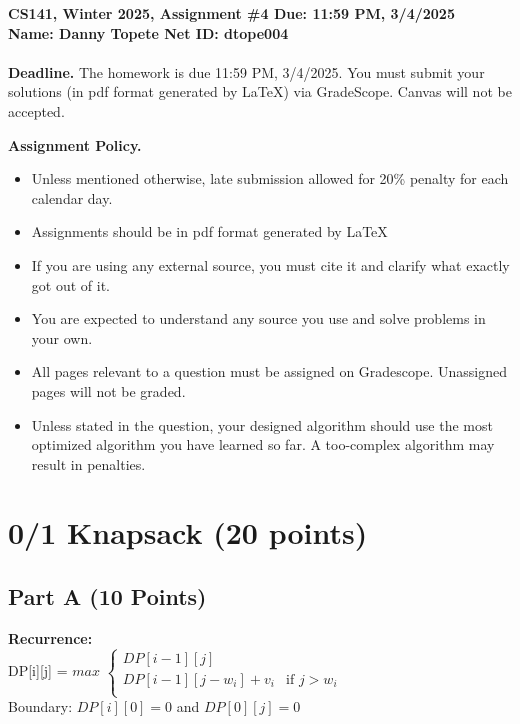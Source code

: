\documentclass{article}[12pt]
\newcommand{\policy}[1]{#1}
\newcommand{\policy}[1]{}
\newcommand{\deadline}{11:59 PM, 3/4/2025}
\newcommand{\assigntitle}[1]{{
  \noindent \large \bf
  CS141, Winter 2025,
  Assignment \##1 \hfill Due: {\deadline}\\
  Name: Danny Topete %
  \hspace{2.5in}
  Net ID: dtope004 %
  \\
  [-.05in]
  \mbox{}\hrulefill \mbox{}\\}}
\begin{document}
\assigntitle{4}{}
\policy{\textbf{Deadline.} The homework is due 11:59 PM, 3/4/2025. You must submit your solutions (in pdf
format generated by LaTeX) via GradeScope. Canvas will not be accepted.}\\
\date{}
\policy{\textbf{Assignment Policy.}
\begin{itemize}
    \item Unless mentioned otherwise, late submission allowed for 20\% penalty for each calendar day.
    \item Assignments should be in pdf format generated by LaTeX
    \item If you are using any external source, you must cite it and clarify what exactly got out of it.
    \item You are expected to understand any source you use and solve problems in your own.
    \item All pages relevant to a question must be assigned on Gradescope. Unassigned pages will not be graded.
    \item Unless stated in the question, your designed algorithm should use the most optimized algorithm you have learned so far. A too-complex algorithm may result in penalties.
\end{itemize}


}

\section{0/1 Knapsack (20 points)}
\subsection{Part A (10 Points)}

\noindent\textbf{Recurrence:} \\

  
DP[i][j] = $max$
$\begin{cases}
     DP[i-1][j] \\
     DP[i-1][j-w_i] + v_i & \text{if } j > w_i \\
  
\end{cases}$ \\

Boundary: $DP[i][0] = 0$ and $DP[0][j] = 0$ \\
\end{document}
